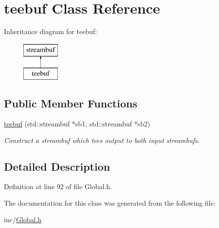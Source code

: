\hypertarget{classteebuf}{\section{teebuf Class Reference}
\label{classteebuf}
}
Inheritance diagram for teebuf\-:\begin{figure}[H]
\begin{center}
\leavevmode
\includegraphics[height=2.000000cm]{classteebuf}
\end{center}
\end{figure}
\subsection*{Public Member Functions}
\begin{DoxyCompactItemize}
\item 
\hypertarget{classteebuf_a874f4618a07d33370216658636c23558}{\hyperlink{classteebuf_a874f4618a07d33370216658636c23558}{teebuf} (std\-::streambuf $\ast$sb1, std\-::streambuf $\ast$sb2)}\label{classteebuf_a874f4618a07d33370216658636c23558}

\begin{DoxyCompactList}\small\item\em Construct a streambuf which tees output to both input streambufs. \end{DoxyCompactList}\end{DoxyCompactItemize}


\subsection{Detailed Description}


Definition at line 92 of file Global.\-h.



The documentation for this class was generated from the following file\-:\begin{DoxyCompactItemize}
\item 
inc/\hyperlink{Global_8h}{Global.\-h}\end{DoxyCompactItemize}
